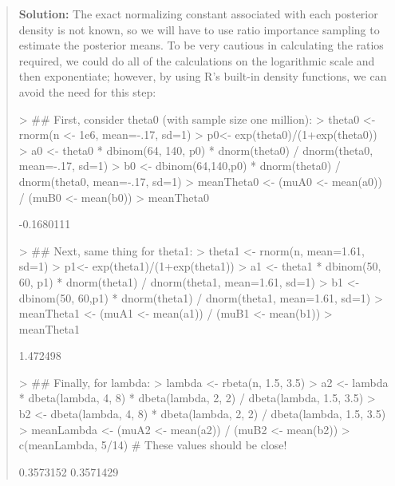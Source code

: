 \documentclass{article}
\begin{document}
\begin{enumerate}[(i)]
\begin{quotation}{\bf Solution:}
The exact normalizing
constant associated with each posterior density is not known, so we will have to use 
ratio importance sampling to estimate the posterior means.  
To be very cautious in calculating the ratios required, we could do all of the calculations on 
the logarithmic scale and then exponentiate; however, by using R's built-in density functions,
we can avoid the need for this step:
\begin{Schunk}
\begin{Sinput}
> ## First, consider theta0 (with sample size one million):
> theta0 <- rnorm(n <- 1e6, mean=-.17, sd=1)
> p0<- exp(theta0)/(1+exp(theta0))
> a0 <- theta0 * dbinom(64, 140, p0) * dnorm(theta0) / dnorm(theta0, mean=-.17, sd=1)
> b0 <- dbinom(64,140,p0) * dnorm(theta0) / dnorm(theta0, mean=-.17, sd=1)
> meanTheta0 <- (muA0 <- mean(a0)) / (muB0 <- mean(b0))
> meanTheta0
\end{Sinput}
\begin{Soutput}
[1] -0.1680111
\end{Soutput}
\begin{Sinput}
> ## Next, same thing for theta1:
> theta1 <- rnorm(n, mean=1.61, sd=1)
> p1<- exp(theta1)/(1+exp(theta1))
> a1 <- theta1 * dbinom(50, 60, p1) * dnorm(theta1) / dnorm(theta1, mean=1.61, sd=1)
> b1 <- dbinom(50, 60,p1) * dnorm(theta1) / dnorm(theta1, mean=1.61, sd=1)
> meanTheta1 <- (muA1 <- mean(a1)) / (muB1 <- mean(b1))
> meanTheta1
\end{Sinput}
\begin{Soutput}
[1] 1.472498
\end{Soutput}
\begin{Sinput}
> ## Finally, for lambda:
> lambda <- rbeta(n, 1.5, 3.5)
> a2 <- lambda * dbeta(lambda, 4, 8) * dbeta(lambda, 2, 2) / dbeta(lambda, 1.5, 3.5)
> b2 <- dbeta(lambda, 4, 8) * dbeta(lambda, 2, 2) / dbeta(lambda, 1.5, 3.5)
> meanLambda <- (muA2 <- mean(a2)) / (muB2 <- mean(b2))
> c(meanLambda, 5/14) # These values should be close!
\end{Sinput}
\begin{Soutput}
[1] 0.3573152 0.3571429
\end{Soutput}
\end{Schunk}
\end{quotation}


\end{enumerate}
\end{document}
